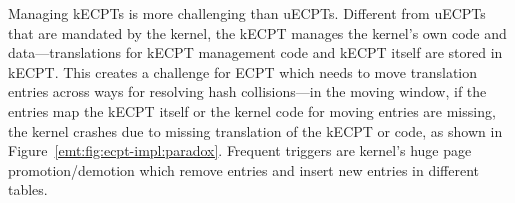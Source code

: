 

\label{emt:ss:ecpt-self-reference}
Managing kECPTs is more challenging than uECPTs.
Different from uECPTs that are mandated by the kernel, 
	the kECPT manages the kernel's own code and data---translations 
	for kECPT management code and kECPT itself
	are stored in kECPT.
This creates a challenge for ECPT which needs to move translation entries 
	across ways for resolving hash collisions---in the
	moving window, if the entries map the kECPT itself 
		or the kernel code for moving entries are missing,
		the kernel crashes due to missing translation of the kECPT or code,
		as shown in Figure~\ref{emt:fig:ecpt-impl:paradox}.
Frequent triggers are kernel's huge page promotion/demotion
	which remove entries and insert new entries in different tables. 

